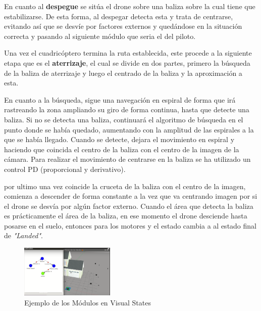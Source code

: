 \hspace{1cm} En cuanto al \textbf{despegue} se sitúa el drone sobre una baliza sobre la cual tiene que estabilizarse. De esta forma, al despegar detecta esta y trata de centrarse, evitando así que se desvíe por factores externos y quedándose en la situación correcta y pasando al siguiente módulo que seria el del piloto. 

\hspace{1cm} Una vez el cuadricóptero termina la ruta establecida, este procede a la siguiente etapa que es el \textbf{aterrizaje}, el cual se divide en dos partes, primero la búsqueda de la baliza de aterrizaje y luego el centrado de la baliza y la aproximación a esta. 

\hspace{1cm} En cuanto a la búsqueda, sigue una navegación en espiral de forma que irá rastreando la zona ampliando su giro de forma continua, hasta que
detecte una baliza. Si no se detecta una baliza, continuará el algoritmo de búsqueda en el punto donde se había quedado, aumentando con la amplitud de las espirales a la que se había llegado. Cuando se detecte, dejara el movimiento en espiral y haciendo que coincida el centro de la baliza con el centro de la imagen de la cámara.  Para realizar el movimiento de centrarse en la baliza se ha utilizado un control PD (proporcional y derivativo).  

\hspace{1cm} por ultimo una vez coincide la cruceta de la baliza con el centro de la imagen, comienza a descender de forma constante a la vez que va centrando imagen por si el drone se desvía por algún factor externo. Cuando el área que detecta la baliza es prácticamente el área de la baliza, en ese momento el drone desciende  hasta  posarse en el suelo, entonces para los motores y el estado cambia a al estado final de \textit{"Landed"}.

\begin{figure}[H]
	\begin{center}
		\includegraphics[width=0.4\textwidth]{imag/IMG34.png}
				\caption{Ejemplo de los Módulos en Visual States}
		\label{fig:Ejemplo Visual States.}	
	\end{center}
\end{figure}

